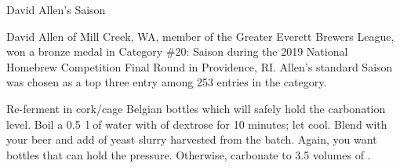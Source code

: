 \documentclass[fontsize=9pt,oneside]{scrbook}
\begin{document}
\mainmatter


\begin{recipe}{David Allen's Saison}

\begin{aboutblock}
David Allen of Mill Creek, WA, member of the Greater Everett Brewers League, won
a bronze medal in Category \#20: Saison during the 2019 National Homebrew
Competition Final Round in Providence, RI. Allen's standard Saison was chosen as
a top three entry among 253 entries in the category. \sourceaha
\end{aboutblock}


\begin{methodandtiming}
 
\begin{mashsteps}
\end{mashsteps}

\begin{fermentationsteps}
\end{fermentationsteps}

\begin{directions}
Re-ferment in cork/cage Belgian bottles which will safely hold the carbonation level.
Boil a 0.5~l of water with  of dextrose for 10 minutes; let cool. Blend with
your beer and add  of yeast slurry harvested from the batch.
Again, you want bottles that can hold the pressure. Otherwise, carbonate to 3.5 volumes
of .
\end{directions}

\end{methodandtiming}

\recipebreak

\begin{ingredientsblock}

\begin{malts}
\end{malts}

\begin{hops}
\end{hops}


\end{ingredientsblock}
\end{recipe}
\end{document}
